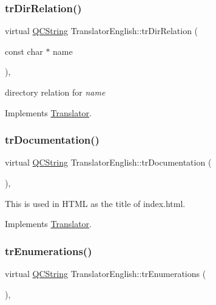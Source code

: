 \subsubsection{\texorpdfstring{trDirRelation()}{trDirRelation()}}
{\footnotesize\ttfamily virtual \mbox{\hyperlink{class_q_c_string}{Q\+C\+String}} Translator\+English\+::tr\+Dir\+Relation (\begin{DoxyParamCaption}\item[{const char $\ast$}]{name }\end{DoxyParamCaption})\hspace{0.3cm}{\ttfamily [inline]}, {\ttfamily [virtual]}}

directory relation for {\itshape name} 

Implements \mbox{\hyperlink{class_translator}{Translator}}.

\mbox{\label{class_translator_english_ac95ef3bd6ff33eacb95b5a8215a37805}} 
\subsubsection{\texorpdfstring{trDocumentation()}{trDocumentation()}}
{\footnotesize\ttfamily virtual \mbox{\hyperlink{class_q_c_string}{Q\+C\+String}} Translator\+English\+::tr\+Documentation (\begin{DoxyParamCaption}{ }\end{DoxyParamCaption})\hspace{0.3cm}{\ttfamily [inline]}, {\ttfamily [virtual]}}

This is used in H\+T\+ML as the title of index.\+html. 

Implements \mbox{\hyperlink{class_translator}{Translator}}.

\mbox{\label{class_translator_english_a842268902d5370a725cad5568632dcd7}} 
\subsubsection{\texorpdfstring{trEnumerations()}{trEnumerations()}}
{\footnotesize\ttfamily virtual \mbox{\hyperlink{class_q_c_string}{Q\+C\+String}} Translator\+English\+::tr\+Enumerations (\begin{DoxyParamCaption}{ }\end{DoxyParamCaption})\hspace{0.3cm}{\ttfamily [inline]}, {\ttfamily [virtual]}}

